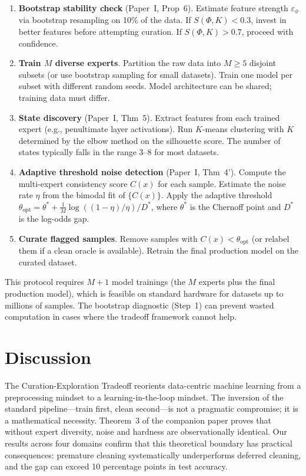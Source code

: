 \begin{enumerate}
	\item \textbf{Bootstrap stability check} (Paper~I, Prop~6). Estimate feature strength $\varepsilon_\phi$ via bootstrap resampling on 10\% of the data. If $S(\Phi, K) < 0.3$, invest in better features before attempting curation. If $S(\Phi, K) > 0.7$, proceed with confidence.
	\item \textbf{Train $M$ diverse experts}. Partition the raw data into $M \geq 5$ disjoint subsets (or use bootstrap sampling for small datasets). Train one model per subset with different random seeds. Model architecture can be shared; training data must differ.
	\item \textbf{State discovery} (Paper~I, Thm~5). Extract features from each trained expert (e.g., penultimate layer activations). Run $K$-means clustering with $K$ determined by the elbow method on the silhouette score. The number of states typically falls in the range 3--8 for most datasets.
	\item \textbf{Adaptive threshold noise detection} (Paper~I, Thm~4'). Compute the multi-expert consistency score $C(x)$ for each sample. Estimate the noise rate $\eta$ from the bimodal fit of $\{C(x)\}$. Apply the adaptive threshold $\theta_{\text{opt}} = \theta^* + \frac{1}{M} \log((1-\eta)/\eta)/D^*$, where $\theta^*$ is the Chernoff point and $D^*$ is the log-odds gap.
	\item \textbf{Curate flagged samples}. Remove samples with $C(x) < \theta_{\text{opt}}$ (or relabel them if a clean oracle is available). Retrain the final production model on the curated dataset.
\end{enumerate}

This protocol requires $M+1$ model trainings (the $M$ experts plus the final production model), which is feasible on standard hardware for datasets up to millions of samples. The bootstrap diagnostic (Step~1) can prevent wasted computation in cases where the tradeoff framework cannot help.

\section{Discussion}

The Curation-Exploration Tradeoff reorients data-centric machine learning from a preprocessing mindset to a learning-in-the-loop mindset. The inversion of the standard pipeline---train first, clean second---is not a pragmatic compromise; it is a mathematical necessity. Theorem~3 of the companion paper proves that without expert diversity, noise and hardness are observationally identical. Our results across four domains confirm that this theoretical boundary has practical consequences: premature cleaning systematically underperforms deferred cleaning, and the gap can exceed 10 percentage points in test accuracy.

